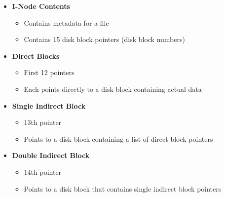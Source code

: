 \documentclass[8pt,twocolumn]{article}
\begin{document}
\begin{itemize}
  \small
  \setlength{\itemsep}{0pt} %
  \setlength{\parskip}{0pt}
  \item \textbf{I-Node Contents}
\vspace{-0.6em}
\begin{itemize}
    \setlength{\itemsep}{0pt} %
    \setlength{\parskip}{0pt}
      \item Contains metadata for a file
      \item Contains 15 disk block pointers (disk block numbers)
  \end{itemize}
  \vspace{-0.6em}
  \item \textbf{Direct Blocks}
\vspace{-0.4em}
\begin{itemize}
    \setlength{\itemsep}{0pt} %
    \setlength{\parskip}{0pt}
      \item First 12 pointers
      \item Each points directly to a disk block containing actual data
  \end{itemize}
  \vspace{-0.6em}
  \item \textbf{Single Indirect Block}
\vspace{-0.4em}
\begin{itemize}
    \setlength{\itemsep}{0pt} %
    \setlength{\parskip}{0pt}
      \item 13th pointer
      \item Points to a disk block containing a list of direct block pointers
  \end{itemize}
  \vspace{-0.6em}
  \item \textbf{Double Indirect Block}
\vspace{-0.4em}
\begin{itemize}
    \setlength{\itemsep}{0pt} %
    \setlength{\parskip}{0pt}
      \item 14th pointer
      \item Points to a disk block that contains single indirect block pointers
  \end{itemize}
  \vspace{-0.6em}
\end{itemize}
\vspace{-1.2em}
\end{document}
